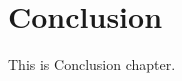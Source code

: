 \documentclass[twocolumn]{article}
\begin{document}

\section{Conclusion}
This is Conclusion chapter.



\end{document}
